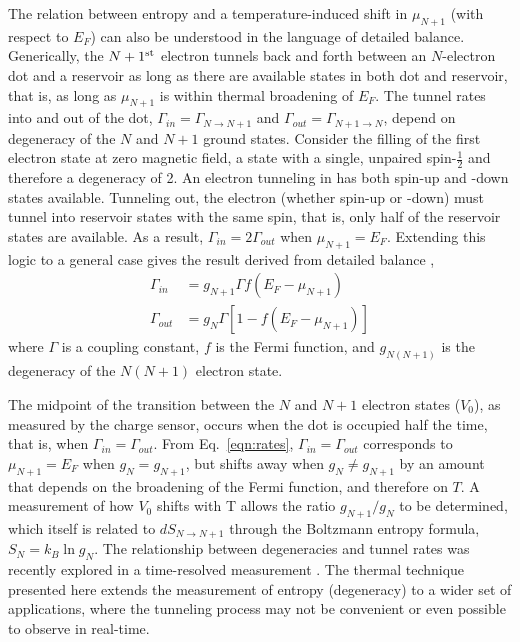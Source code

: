 \documentclass[preprint,showpacs,preprintnumbers,amsmath,amssymb,pra,aps,superscriptaddress]{revtex4-1}
\begin{document}
The relation between entropy and a temperature-induced shift in $\mu_{N+1}$ (with respect to $E_F$) can also be understood in the language of detailed balance.   Generically, the $N+1^{\rm st}$ electron tunnels back and forth between an $N$-electron dot and a reservoir as long as there are available states in both dot and reservoir, that is, as long as $\mu_{N+1}$ is within thermal broadening of $E_F$.  The tunnel rates into and out of the dot, $\Gamma_{in}=\Gamma_{N\rightarrow N+1}$ and $\Gamma_{out}=\Gamma_{N+1\rightarrow N}$, depend on degeneracy of the $N$ and $N+1$ ground states.  Consider the filling of the first electron state at zero magnetic field, a state with a single, unpaired spin-$\frac{1}{2}$ and therefore a degeneracy of 2. An electron tunneling in has both spin-up and -down states available.  Tunneling out, the electron (whether spin-up or -down) must tunnel into reservoir states with the same spin, that is, only half of the reservoir states are available. As a result, $\Gamma_{in} = 2\Gamma_{out}$ when $\mu_{N+1}=E_F$. Extending this logic to a general case gives the result derived from detailed balance \cite{Gustavsson2009}, 
%
\begin{align}
	\Gamma_{in} &=  g_{N+1} \Gamma f(E_F - \mu_{N+1}) \label{eqn:rates}\\
	\Gamma_{out} &= g_{N} \Gamma [1 - f(E_F - \mu_{N+1})] \nonumber
\end{align}
%
where $\Gamma$ is a coupling constant, $f$ is the Fermi function, and $g_{N(N+1)}$ is the degeneracy of the $N(N+1)$ electron state.

The midpoint of the transition between the $N$ and $N+1$ electron states ($V_0$), as measured by the charge sensor, occurs when the dot is occupied half the time, that is, when $\Gamma_{in} = \Gamma_{out}$. From Eq.~\ref{eqn:rates}, $\Gamma_{in} = \Gamma_{out}$ corresponds to $\mu_{N+1} = E_F$ when $g_{N}=g_{N+1}$, but shifts away when $g_{N}\neq g_{N+1}$ by an amount that depends on the broadening of the Fermi function, and therefore on $T$.   A measurement of how $V_0$ shifts with T allows the ratio $g_{N+1}/g_{N}$ to be determined, which itself is related to $dS_{N\rightarrow N+1}$ through the Boltzmann entropy formula, $S_{N}=k_{B} \ln{g_N}$.  The relationship between degeneracies and tunnel rates was recently explored in a time-resolved measurement \cite{Hofmann2016}.  The thermal technique presented here extends the measurement of entropy (degeneracy) to a wider set of applications, where the tunneling process may not be convenient or even possible to observe in real-time.
\end{document}
